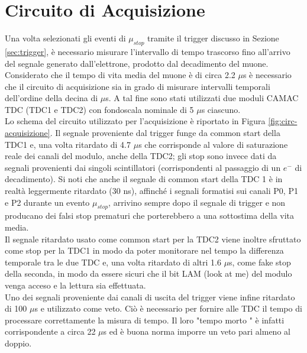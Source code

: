 \documentclass{standalone}
\begin{document}
\section{Circuito di Acquisizione}
\label{sec:acquisizione}
Una volta selezionati gli eventi di $\mu_{stop}$ tramite il trigger discusso in Sezione \ref{sec:trigger}, \`e necessario misurare l'intervallo di tempo trascorso
fino all'arrivo del segnale generato dall'elettrone, prodotto dal decadimento del muone.
Considerato che il tempo di vita media del muone \`e di circa 2.2 $\mu$s \`e necessario che il circuito di acquisizione sia in grado di misurare intervalli temporali dell'ordine della decina di $\mu$s. A
tal fine sono stati utilizzati due moduli CAMAC TDC (TDC1 e TDC2) con fondoscala nominale di 5 $\mu$s ciascuno.\\
Lo schema del circuito utilizzato per l'acquisizione \`e riportato in Figura \ref{fig:circ-acquisizione}. Il segnale proveniente dal trigger funge da common start della TDC1 e, una volta ritardato di 4.7 $\mu$s che corrisponde al valore di saturazione reale dei canali del modulo, anche della TDC2; gli stop sono invece dati da segnali provenienti dai singoli scintillatori (corrispondenti al passaggio di un $e^-$ di decadimento). Si noti che anche il segnale di common start della TDC 1 \`e in realt\`a leggermente ritardato (30 ns), affinch\'e i segnali formatisi sui canali P0, P1 e P2 durante un evento $\mu_{stop}$, arrivino sempre dopo il segnale di trigger e non producano dei falsi stop prematuri che porterebbero a una sottostima della vita media.\\
Il segnale ritardato usato come common start per la TDC2 viene inoltre sfruttato come stop per la TDC1 in modo da poter monitorare nel tempo la differenza temporale tra le due TDC e, una volta ritardato di altri 1.6 $\mu$s, come fake stop della seconda, in modo da essere sicuri che il bit LAM (look at me) del modulo venga acceso e la lettura sia effettuata.\\
Uno dei segnali proveniente dai canali di uscita del trigger viene infine ritardato di 100 $\mu$s e utilizzato come veto. Ci\`o \`e necessario per fornire alle TDC il tempo di processare correttamente la misura di tempo. Il loro "tempo morto " \`e infatti corrispondente a circa 22 $\mu$s ed \`e buona norma imporre un veto pari almeno al doppio.
\clearpage
\end{document}
